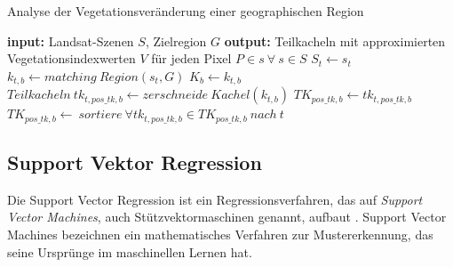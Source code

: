 \begin{algorithm}[H]
\small
\caption{Analyse der Vegetationsveränderung einer geographischen Region}
\label{alg:generalAlgorithm}
\begin{algorithmic}[1]
	\State \textbf{input:} Landsat-Szenen $S$, Zielregion $G$
	\State \textbf{output:} Teilkacheln mit approximierten Vegetationsindexwerten $V$ für jeden Pixel $P \in s\ \forall\ s \in S$
        		\State $S_t \leftarrow s_t $ \label{alg:groupOriginalScenes}
	\EndFor
	 \label{alg:dataCubeCreation}
			\State $k_{t, b} \leftarrow matching\ Region (s_t, G)$ \label{alg:cutAllTilesOfAGroup}
			\State $K_{b} \leftarrow k_{t, b}$ \label{alg:groupTiles}
		\EndFor
	\EndFor
	 \label{alg:flatMapOperator}
		\State $Teilkacheln\ tk_{t, pos\_tk, b} \leftarrow zerschneide\ Kachel (k_{t, b})$ \label{alg:sliceAllTiles}
		\State $TK_{pos\_tk, b} \leftarrow tk_{t, pos\_tk, b}$ \label{alg:groupSubscenes}
	\EndFor
		\State $TK_{pos\_tk, b} \leftarrow\ sortiere\ \forall tk_{t, pos\_tk, b} \in TK_{pos\_tk, b}\ nach\ t$ \label{alg:sortSubscenes}
		 \label{alg:createPixelTimeSeriesLoopStart}
				 \label{alg:createPixelTimeSeries}
			\EndFor
		\EndFor \label{alg:createPixelTimeSeriesLoopEnd}
			 \label{alg:approxPixelTimeSeries}
		\EndFor
	\EndFor
\EndFunction

\end{algorithmic}
\end{algorithm}

\subsection{Support Vektor Regression}
\label{subsec:svr}
Die Support Vector Regression ist ein Regressionsverfahren, das auf \textit{Support Vector Machines}, auch Stützvektormaschinen genannt, aufbaut \cite{Drucker97}. Support Vector Machines bezeichnen ein mathematisches Verfahren zur Mustererkennung, das seine Ursprünge im maschinellen Lernen hat. 

